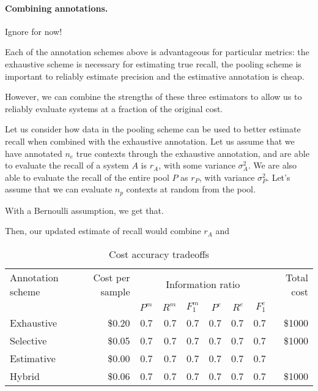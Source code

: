 \paragraph{Combining annotations.}
\ac{Ignore for now!}

Each of the annotation schemes above is advantageous for particular metrics: the exhaustive scheme is necessary for estimating true recall, the pooling scheme is important to reliably estimate precision and the estimative annotation is cheap.

However, we can combine the strengths of these three estimators to allow us to reliably evaluate systems at a fraction of the original cost.

Let us consider how data in the pooling scheme can be used to better estimate recall when combined with the exhaustive annotation.
Let us assume that we have annotated $n_e$ true contexts through the exhaustive annotation, and are able to evaluate the recall of a system $A$ is $r_A$, with some variance $\sigma^2_A$.
We are also able to evaluate the recall of the entire pool $P$ as $r_P$, with variance $\sigma^2_P$.
Let's assume that we can evaluate $n_p$ contexts at random from the pool. 

With a Bernoulli assumption, we get that.

Then, our updated estimate of recall would combine $r_A$ and 


\begin{table*}
  \begin{tabular}{l r r r r r r r r} \toprule
    Annotation scheme & Cost per sample & \multicolumn{6}{c}{Information ratio} & Total cost \\ 
                      &                      & $P^m$ & $R^m$ & $F_1^m$ & $P^e$ & $R^e$ & $F_1^e$ &  \\ \midrule
    Exhaustive & \$0.20 & 0.7 & 0.7 & 0.7 & 0.7 & 0.7 & 0.7 & \$1000 \\
    Selective  & \$0.05 & 0.7 & 0.7 & 0.7 & 0.7 & 0.7 & 0.7 & \$1000 \\
    Estimative & \$0.00 & 0.7 & 0.7 & 0.7 & 0.7 & 0.7 & 0.7 &  \\
    Hybrid     & \$0.06 & 0.7 & 0.7 & 0.7 & 0.7 & 0.7 & 0.7 & \$1000 \\ \bottomrule
  \end{tabular}
  \caption{Cost accuracy tradeoffs}
\end{table*}

